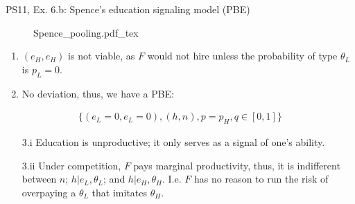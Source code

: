 \begin{frame}{PS11, Ex. 6.b: Spence’s education signaling model (PBE)}
\begin{multicols}{2}
\begin{figure}[!h]
        \center{}
        {Spence_pooling.pdf_tex}
      \end{figure}\vspace{-8pt}
      \begin{enumerate}
        \item $(e_H,e_H)$ is not viable, as $F$ would not hire unless the probability of type $\theta_L$ is $p_L=0$.
        \item \vspace{-2pt} No deviation, thus, we have a PBE:
      \end{enumerate}\vspace{-15pt}
      \begin{align*}
        \{(e_L=0,e_L=0),(h,n),p=p_H,q\in[0,1]\}
      \end{align*}\vspace{-24pt}
      \begin{itemize}
        \item[3.i] Education is unproductive; it only serves as a signal of one's ability.
        \item[3.ii] \vspace{-4pt} Under competition, $F$ pays marginal productivity, thus, it is indifferent between $n$; $h|e_L,\theta_L$; and $h|e_H,\theta_H$. I.e. $F$ has no reason to run the risk of overpaying a $\theta_L$ that imitates $\theta_H$.
      \end{itemize}
      \vfill\null
    \end{multicols}
\end{frame}
